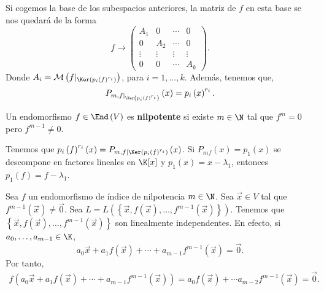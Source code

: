 \begin{observation}
\normalfont Si cogemos la base de los subespacios anteriores, la matriz de $\displaystyle f $ en esta base se nos quedará de la forma
\[ f \to \begin{pmatrix} A_{1} & 0 & \cdots & 0 \\
0 & A_{2} & \cdots & 0 \\
\vdots & \vdots & \vdots & \vdots \\
0 & 0 & \cdots & A_{k}\end{pmatrix} .\]
Donde $\displaystyle A_{i}  = \mathcal{M}\left(f|_{\Ker\left(p_{i}\left(f\right)^{r_{i}}\right)}\right) $, para $\displaystyle i = 1, \ldots, k $. Además, tenemos que,
\[ P_{m, f|_{\Ker\left(p_{i}\left(f\right)^{r_{i}}\right)}}\left(x\right) = p_{i}\left(x\right)^{r_{i}}.\]
\end{observation}
\begin{fdefinition}[]
\normalfont Un endomorfismo $\displaystyle f \in \End\left(V\right) $ es \textbf{nilpotente} si existe $\displaystyle m \in \N $ tal que $\displaystyle f^{m} = 0 $ pero $\displaystyle f^{m - 1} \neq 0 $.
\end{fdefinition}
\begin{observation}
	\normalfont Tenemos que $\displaystyle p_{i}\left(f\right) ^{r_{i}}\left(x\right) = P_{m,f|\Ker\left(p_{i}\left(f\right)^{r_{i}}\right)}\left(x\right) $. Si $\displaystyle P_{mf}\left(x\right) = p_{1}\left(x\right) $ se descompone en factores lineales en $\displaystyle \K[x] $ y $\displaystyle p_{1}\left(x\right) = x - \lambda_{1} $, entonces $\displaystyle p_{1}\left(f\right) = f - \lambda_{1} $.
\end{observation}
Sea $\displaystyle f $ un endomorfismo de índice de nilpotencia $\displaystyle m \in \N $. Sea $\displaystyle \vec{x} \in V $ tal que $\displaystyle f^{m - 1}\left(\vec{x}\right) \neq \vec{0} $. Sea $\displaystyle L = L\left( \left\{ \vec{x}, f\left(\vec{x}\right), \ldots, f^{m - 1}\left(\vec{x}\right)\right\} \right) $. Tenemos que $\displaystyle \left\{ \vec{x}, f\left(\vec{x}\right), \ldots, f^{m -1}\left(\vec{x}\right)\right\}  $ son linealmente independentes. En efecto, si $\displaystyle a_{0}, \ldots, a_{m - 1} \in \K $,
\[a_{0}\vec{x} + a_{1}f\left(\vec{x}\right) + \cdots + a_{m - 1}f^{m - 1}\left(\vec{x}\right) = \vec{0} .\]
Por tanto,
\[
\begin{split}
f\left(a_{0}\vec{x} + a_{1}f\left(\vec{x}\right) + \cdots + a_{m - 1}f^{m - 1}\left(\vec{x}\right)\right) = a_{0}f\left(\vec{x}\right) + \cdots a_{m -2}f^{m -1}\left(\vec{x}\right) = \vec{0}.
\end{split}
\]
